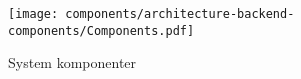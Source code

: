 \begin{figure}[H]
    \begin{small}
        \begin{center}
            \texttt{[image: components/architecture-backend-components/Components.pdf]}
        \end{center}
        \caption{System komponenter}
        \label{fig:system-components}
    \end{small}
\end{figure}
